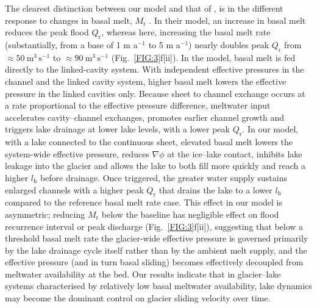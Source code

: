 \documentclass[tc, manuscript]{copernicus}
\begin{document}
The clearest distinction between our model and that of \citet{kingslake2013modelling}, is in the different response to changes in basal melt, $M_{\mathrm{r}}$ \citep[denoted by cavity water supply, $M_{\mathrm{c}}$, in ][]{kingslake2013modelling}. In their model, an increase in basal melt reduces the peak flood $Q_{\mathrm{r}}$, whereas here, increasing the basal melt rate (substantially, from a base of 1 m a$^{-1}$ to 5 m a$^{-1}$) nearly doubles peak $Q_{\mathrm{r}}$ from $\approx50\ \mathrm{m}^{3}\, \mathrm{s}^{-1}$ to $\approx90\ \mathrm{m}^{3}\, \mathrm{s}^{-1}$  (Fig.~\ref{FIG:3}f[ii]). In the \citet{kingslake2013modelling} model, basal melt is fed directly to the linked-cavity system. With independent effective pressures in the channel and the linked cavity system, higher basal melt lowers the effective pressure in the linked cavities only. Because sheet to channel exchange occurs at a rate proportional to the effective pressure difference, meltwater input accelerates cavity--channel exchanges, promotes earlier channel growth and triggers lake drainage at lower lake levels, with a lower peak $Q_{\mathrm{r}}$. In our model, with a lake connected to the continuous sheet, elevated basal melt lowers the system-wide effective pressure, reduces $\nabla \phi$ at the ice--lake contact, inhibits lake leakage into the glacier and allows the lake to both fill more quickly and reach a higher $l_{\mathrm{h}}$ before drainage. Once triggered, the greater water supply sustains enlarged channels with a higher peak $Q_{\mathrm{r}}$ that drains the lake to a lower $l_{\mathrm{h}}$ compared to the reference basal melt rate case. This effect in our model is asymmetric; reducing $M_{\mathrm{r}}$ below the baseline has negligible effect on flood recurrence interval or peak discharge (Fig.~\ref{FIG:3}f[ii]), suggesting that below a threshold basal melt rate the glacier-wide effective pressure is governed primarily by the lake drainage cycle itself rather than by the ambient melt supply, and the effective pressure (and in turn basal sliding) becomes effectively decoupled from meltwater availability at the bed. Our results indicate that in glacier--lake systems characterised by relatively low basal meltwater availability, lake dynamics may become the dominant control on glacier sliding velocity over time.
\end{document}
